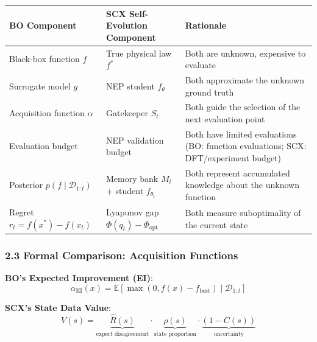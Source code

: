 \documentclass[
  12pt,
]{ctexart}
\begin{document}
\begin{longtable}[]{@{}
  >{\raggedright\arraybackslash}p{}
  >{\raggedright\arraybackslash}p{}
  >{\raggedright\arraybackslash}p{}@{}}
\toprule\noalign{}
\begin{minipage}[b]{\linewidth}\raggedright
BO Component
\end{minipage} & \begin{minipage}[b]{\linewidth}\raggedright
SCX Self-Evolution Component
\end{minipage} & \begin{minipage}[b]{\linewidth}\raggedright
Rationale
\end{minipage} \\
\midrule\noalign{}
\endhead
\bottomrule\noalign{}
\endlastfoot
Black-box function \(f\) & True physical law \(f^*\) & Both are unknown,
expensive to evaluate \\
Surrogate model \(g\) & NEP student \(f_\theta\) & Both approximate the
unknown ground truth \\
Acquisition function \(\alpha\) & Gatekeeper \(S_t\) & Both guide the
selection of the next evaluation point \\
Evaluation budget & NEP validation budget & Both have limited
evaluations (BO: function evaluations; SCX: DFT/experiment budget) \\
Posterior \(p(f \mid \mathcal{D}_{1:t})\) & Memory bank \(M_t\) +
student \(f_{\theta_t}\) & Both represent accumulated knowledge about
the unknown function \\
Regret \(r_t = f(x^*) - f(x_t)\) & Lyapunov gap
\(\Phi(q_t) - \Phi_{\text{opt}}\) & Both measure suboptimality of the
current state \\
\end{longtable}

\subsubsection{2.3 Formal Comparison: Acquisition
Functions}\label{formal-comparison-acquisition-functions}

\textbf{BO's Expected Improvement (EI)}:
\[\alpha_{\text{EI}}(x) = \mathbb{E}\left[\max(0, f(x) - f_{\text{best}}) \mid \mathcal{D}_{1:t}\right]\]

\textbf{SCX's State Data Value}:
\[V(s) = \underbrace{\hat{R}(s)}_{\text{expert disagreement}} \cdot \underbrace{\rho(s)}_{\text{state proportion}} \cdot \underbrace{(1 - C(s))}_{\text{uncertainty}}\]
\end{document}
